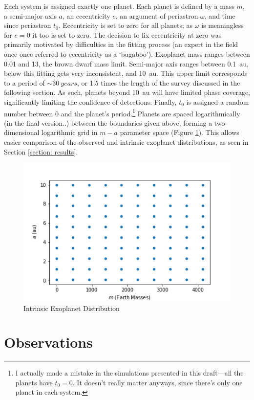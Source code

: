 \documentclass[12pt,manuscript]{aastex}
\begin{document}
Each system is assigned exactly one planet. 
Each planet is defined by a mass $m$, a semi-major axis $a$, an eccentricity $e$, an argument of periastron $\omega$, and time since periastron $t_0$. 
Eccentricity is set to zero for all planets; as $\omega$ is meaningless for $e=0$ it too is set to zero. 
The decision to fix eccentricity at zero was primarily motivated by difficulties in the fitting process (an expert in the field once once referred to eccentricity as a `bugaboo'). 
Exoplanet mass ranges between \SI{0.01}{\Mearth} and \SI{13}{\Mjup}, the brown dwarf mass limit. 
Semi-major axis ranges between \SI{0.1}{au}, below this fitting gets very inconsistent, and \SI{10}{au}. 
This upper limit corresponds to a period of $\sim \SI{30}{years}$, or 1.5 times the length of the survey discussed in the following section. 
As such, planets beyond \SI{10}{au} will have limited phase coverage, significantly limiting the confidence of detections.
Finally, $t_0$ is assigned a random number between 0 and the planet's period.\footnote{I actually made a mistake in the simulations presented in this draft---all the planets have $t_0=0$. It doesn't really matter anyways, since there's only one planet in each system.}
Planets are spaced logarithmically (in the final version..) between the boundaries given above, forming a two-dimensional logarithmic grid in $m-a$ parameter space (Figure \ref{fig: intrinsic_dist}). This allows easier comparison of the observed and intrinsic exoplanet distributions, as seen in Section \ref{section: results}.

\begin{figure}[h]
  \centering
  \includegraphics[width=0.5\linewidth]{../figures/intrinsic_dist}
  \caption{Intrinsic Exoplanet Distribution}
  \label{fig: intrinsic_dist}
\end{figure}


\section{Observations}
\label{section: survey}
\end{document}
